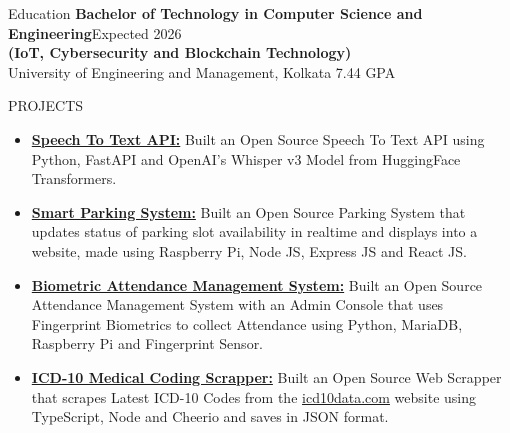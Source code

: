 \documentclass{resume}
\begin{document}
\vspace{-0.4em}
\begin{rSection}{Education}
  \textbf{Bachelor of Technology in Computer Science and Engineering}\hfill {Expected 2026}\\
  \textbf{(IoT, Cybersecurity and Blockchain Technology)}\\
  University of Engineering and Management, Kolkata \hfill  7.44 GPA
\end{rSection}
\vspace{-0.4em}
\begin{rSection}{PROJECTS}
  \begin{itemize}
    \item \textbf{\href{https://github.com/Arkapravo-Ghosh/speech-to-text}{Speech To Text API:}} {Built an Open Source Speech To Text API using Python, FastAPI and OpenAI's Whisper v3 Model from HuggingFace Transformers.}
    \item \textbf{\href{https://github.com/Arkapravo-Ghosh/Smart-Parking-System}{Smart Parking System:}} {Built an Open Source Parking System that updates status of parking slot availability in realtime and displays into a website, made using Raspberry Pi, Node JS, Express JS and React JS.}
    \item \textbf{\href{https://github.com/Arkapravo-Ghosh/attendance-monitoring-system}{Biometric Attendance Management System:}} {Built an Open Source Attendance Management System with an Admin Console that uses Fingerprint Biometrics to collect Attendance using Python, MariaDB, Raspberry Pi and Fingerprint Sensor.}
    \item \textbf{\href{https://github.com/Arkapravo-Ghosh/icd10-scrapper}{ICD-10 Medical Coding Scrapper:}} {Built an Open Source Web Scrapper that scrapes Latest ICD-10 Codes from the {\href{https://www.icd10data.com}{icd10data.com}} website using TypeScript, Node and Cheerio and saves in JSON format.}
  \end{itemize}
\end{rSection}
\vspace{-0.4em}
\end{document}
